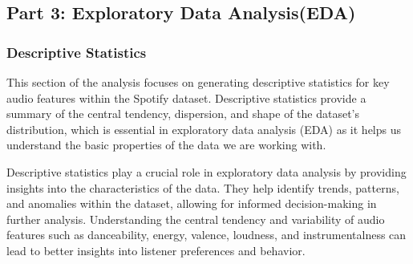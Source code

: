 \documentclass[
]{article}
\begin{document}
\subsection{Part 3: Exploratory Data
Analysis(EDA)}\label{part-3-exploratory-data-analysiseda}

\subsubsection{Descriptive Statistics}\label{descriptive-statistics}

This section of the analysis focuses on generating descriptive
statistics for key audio features within the Spotify dataset.
Descriptive statistics provide a summary of the central tendency,
dispersion, and shape of the dataset's distribution, which is essential
in exploratory data analysis (EDA) as it helps us understand the basic
properties of the data we are working with.

Descriptive statistics play a crucial role in exploratory data analysis
by providing insights into the characteristics of the data. They help
identify trends, patterns, and anomalies within the dataset, allowing
for informed decision-making in further analysis. Understanding the
central tendency and variability of audio features such as danceability,
energy, valence, loudness, and instrumentalness can lead to better
insights into listener preferences and behavior.
\end{document}
